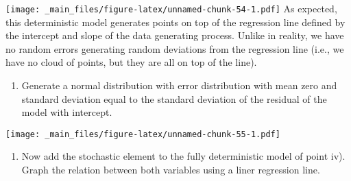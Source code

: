 \documentclass[
]{book}
\newenvironment{Shaded}{\begin{snugshade}}{\end{snugshade}}
\newcommand{\AttributeTok}[1]{\textcolor[rgb]{0.13,0.29,0.53}{#1}}
\newcommand{\DecValTok}[1]{\textcolor[rgb]{0.00,0.00,0.81}{#1}}
\newcommand{\FunctionTok}[1]{\textcolor[rgb]{0.13,0.29,0.53}{\textbf{#1}}}
\newcommand{\NormalTok}[1]{#1}
\newcommand{\OtherTok}[1]{\textcolor[rgb]{0.56,0.35,0.01}{#1}}
\newcommand{\SpecialCharTok}[1]{\textcolor[rgb]{0.81,0.36,0.00}{\textbf{#1}}}
\newcommand{\StringTok}[1]{\textcolor[rgb]{0.31,0.60,0.02}{#1}}
\providecommand{\tightlist}{%
  \setlength{\itemsep}{0pt}\setlength{\parskip}{0pt}}
\begin{document}
\texttt{[image: \_main\_files/figure-latex/unnamed-chunk-54-1.pdf]}
As expected, this deterministic model generates points on top of the regression line defined by the intercept and slope of the data generating process. Unlike in reality, we have no random errors generating random deviations from the regression line (i.e., we have no cloud of points, but they are all on top of the line).

\begin{enumerate}
\def\labelenumi{\alph{enumi}.}
\setcounter{enumi}{21}
\tightlist
\item
  Generate a normal distribution with error distribution with mean zero and standard deviation equal to the standard deviation of the residual of the model with intercept.
\end{enumerate}

\begin{Shaded}
\end{Shaded}

\texttt{[image: \_main\_files/figure-latex/unnamed-chunk-55-1.pdf]}

\begin{enumerate}
\def\labelenumi{\roman{enumi}.}
\setcounter{enumi}{5}
\tightlist
\item
  Now add the stochastic element to the fully deterministic model of point iv). Graph the relation between both variables using a liner regression line.
\end{enumerate}
\end{document}

